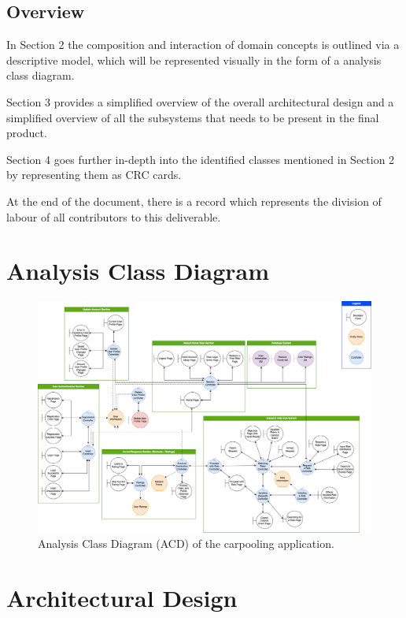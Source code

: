 \documentclass[]{article}
\begin{document}
\subsection{Overview}
\label{sub:overview}
In Section 2 the composition and interaction of domain concepts is outlined via a descriptive model, which will be represented visually in the form of a analysis class diagram. 

Section 3 provides a simplified overview of the overall architectural design and a simplified overview of all the subsystems that needs to be present in the final product. 

Section 4 goes further in-depth into the identified classes mentioned in Section 2 by representing them as CRC cards. 

At the end of the document, there is a record which represents the division of labour of all contributors to this deliverable.



\pagebreak
\section{Analysis Class Diagram}
\label{sec:analysis_class_diagram}
\begin{figure}[h]
	\centering
	\includegraphics[width=49.5em]{assets/3a04_d2_analysis_class_diagram.drawio.png}
	\caption{Analysis Class Diagram (ACD) of the carpooling application.}
	\label{fig:acd}
\end{figure}


\section{Architectural Design}
\label{sec:architectural_design}
\end{document}
